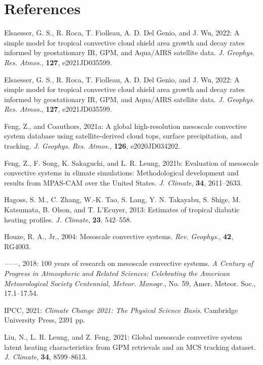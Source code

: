 \documentclass[12pt]{article}
\begin{document}
\section*{References}
\begin{flushleft}
\setlength{\parindent}{-2em}\setlength{\leftskip}{2em}

Elsaesser, G. S., R. Roca, T. Fiolleau, A. D. Del Genio, and J. Wu, 2022: A simple model for tropical convective cloud shield area growth and decay rates informed by geostationary IR, GPM, and Aqua/AIRS satellite data. \textit{J. Geophys. Res. Atmos.}, \textbf{127}, e2021JD035599.

Elsaesser, G. S., R. Roca, T. Fiolleau, A. D. Del Genio, and J. Wu, 2022: A simple model for tropical convective cloud shield area growth and decay rates informed by geostationary IR, GPM, and Aqua/AIRS satellite data. \textit{J. Geophys. Res. Atmos.}, \textbf{127}, e2021JD035599.

Feng, Z., and Coauthors, 2021a: A global high-resolution mesoscale convective system database using satellite-derived cloud tops, surface precipitation, and tracking. \textit{J. Geophys. Res. Atmos.}, \textbf{126}, e2020JD034202.

Feng, Z., F. Song, K. Sakaguchi, and L. R. Leung, 2021b: Evaluation of mesoscale convective systems in climate simulations: Methodological development and results from MPAS-CAM over the United States. \textit{J. Climate}, \textbf{34}, 2611--2633.

Hagoss, S. M., C. Zhang, W.-K. Tao, S. Lang, Y. N. Takayabu, S. Shige, M. Katsumata, B. Olson, and T. L'Ecuyer, 2013: Estimates of tropical diabatic heating profiles. \textit{J. Climate}, \textbf{23}, 542--558.

Houze, R. A., Jr., 2004: Mesoscale convective systems. \textit{Rev. Geophys.}, \textbf{42}, RG4003.

------, 2018: 100 years of research on mesoscale convective systems. \textit{A Century of Progress in Atmospheric and Related Sciences: Celebrating the American Meteorological Society Centennial, Meteor. Monogr.}, No. 59, Amer. Meteor. Soc., 17.1--17.54.

IPCC, 2021: \textit{Climate Change 2021: The Physical Science Basis}. Cambridge University Press, 2391 pp.

Liu, N., L. R. Leung, and Z. Feng, 2021: Global mesoscale convective system latent heating characteristics from GPM retrievals and an MCS tracking dataset. \textit{J. Climate}, \textbf{34}, 8599--8613.


\end{flushleft}
\end{document}
